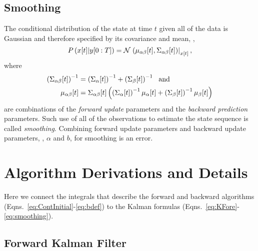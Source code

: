 \subsection{Smoothing}

The conditional distribution of the state at time $t$ given all of the
data is Gaussian and therefore specified by its covariance and mean, \ie,
\begin{equation*}
   P \left({x}{[t]}|y[0:T] \right) = {\mathcal{N}}\left.\left({\mu_{\alpha
   \beta}}{[t]},{\Sigma_{\alpha \beta}}{[t]}\right)\right|_{{x}{[t]}},
\end{equation*}
where
\begin{subequations}
  \label{eq:smoothing}
  \begin{align}
    \left( {\Sigma_{\alpha \beta}}{[t]} \right)^{-1} &= \left(
      {\Sigma_{\alpha}}{[t]} \right)^{-1} + \left(
      {\Sigma_{\beta}}{[t]} \right)^{-1} ~\text{ and} \\
    {\mu_{\alpha \beta}}{[t]} &=
    {\Sigma_{\alpha \beta}}{[t]} \left( \left(
        {\Sigma_{\alpha}}{[t]} \right)^{-1} {\mu_{\alpha}}{[t]} +
      \left( {\Sigma_{\beta}}{[t]} \right)^{-1} {\mu_{\beta}}{[t]}
    \right)
\end{align}
\end{subequations}
are combinations of the \emph{forward update} parameters and the
\emph{backward prediction} parameters.  Such use of all of the
observations to estimate the state sequence is called
\emph{smoothing}.  Combining forward update parameters and backward
update parameters, \ie, $\alpha$ and $b$, for smoothing is an error.

\section{Algorithm Derivations and Details}
\label{sec:KDerive}

Here we connect the integrals that describe the forward and backward
algorithms (Eqns.~\eqref{eq:ContInitial}-\eqref{eq:bdef}) to the
Kalman formulas (Eqns.~\eqref{eq:KFore}-\eqref{eq:smoothing}).

\subsection{Forward Kalman Filter}
\label{sec:DetailForward}

